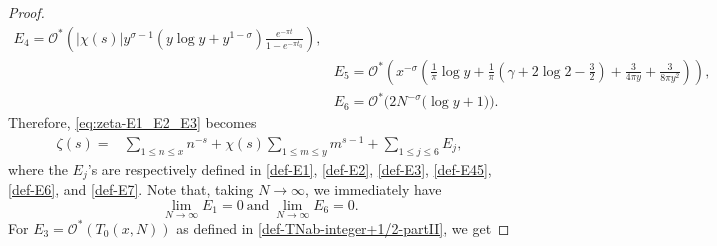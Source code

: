 \documentclass[11pt,letterpaper,oneside,reqno]{amsart}
\renewcommand{\^}[1]{\widehat{#1}}
\numberwithin{equation}{section}
\theoremstyle{remark}
\begin{document}
\begin{proof}
\begin{align}
    E_{4}=\mathcal{O}^* \left( |\chi(s)| y^{\sigma-1} \left( y\log y + y^{1-\sigma}  \right) \frac{e^{-\pi t}}{1 - e^{-\pi t_0}} \right) ,
\\& \label{def-E6}
  E_5 = \mathcal{O}^*\!\left( x^{-\sigma} \left( 
\frac{1 }{ \pi }\log y + \frac{1}{\pi}\left(\gamma+2\log 2-\frac{3}{2}\right)  +\frac{3}{4\pi y} + \frac{3}{8\pi y^2} \right) \right) ,
\\& \label{def-E7}
    E_{6}=\mathcal{O}^*\bigg( 2N^{-\sigma}\bigg(\log y +1 \bigg) \bigg).
\end{align}
Therefore, \eqref{eq:zeta-E1_E2_E3} becomes
\begin{align}
    \zeta(s) = &\sum_{1 \leq n \leq x} n^{-s} + \chi(s) \sum_{1 \leq m \leq y} m^{s-1} + \sum_{1\le j \le 6} E_j, \label{eq: zeta:E1toE7}
\end{align}
where the $E_j$'s are respectively defined in \eqref{def-E1}, \eqref{def-E2}, \eqref{def-E3}, \eqref{def-E45}, \eqref{def-E6}, and \eqref{def-E7}.
Note that, taking $N\to \infty$, we immediately have 
\begin{equation}
\lim_{N \to \infty}   E_1
=0 \ \text{and}\     
\lim_{N \to \infty}E_{6}
=0.
\end{equation}
For $E_3 = \mathcal{O}^*(T_0(x,N))$ as defined in \eqref{def-TNab-integer+1/2-partII}, we get 


\end{proof}
\end{document}
